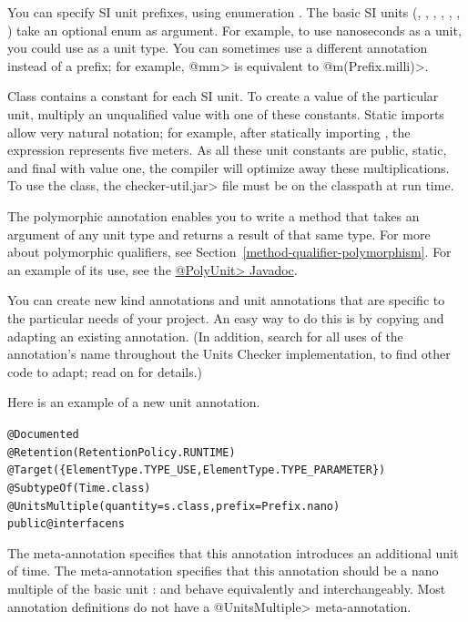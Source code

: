You can specify SI unit prefixes, using enumeration .
The basic SI units
(, , , , ,
 , )
take an optional  enum as argument.
For example, to use nanoseconds as a unit, you could use
 as a unit type.
You can sometimes use a different annotation instead of a prefix;
for example, \<@mm> is equivalent to \<@m(Prefix.milli)>.

Class  contains a constant for each SI unit.
To create a value of the particular unit, multiply an unqualified
value with one of these constants.
Static imports allow very natural notation; for
example, after statically importing ,
the expression  represents five meters.
As all these unit constants are public, static, and final with value
one, the compiler will optimize away these multiplications.
To use the  class, the
\<checker-util.jar> file must be on the classpath at run time.

The polymorphic annotation 
enables you to write a method that takes an argument of any unit type and
returns a result of that same type.  For more about polymorphic qualifiers,
see Section~\ref{method-qualifier-polymorphism}.  For an example of its use, see
the
\href{../api/org/checkerframework/checker/units/qual/PolyUnit.html}{\<@PolyUnit>
Javadoc}.



You can create new kind annotations and unit annotations that are specific
to the particular needs of your project.  An easy way to do this is by
copying and adapting an existing annotation.  (In addition, search for all
uses of the annotation's name throughout the Units Checker implementation,
to find other code to adapt; read on for details.)

Here is an example of a new unit annotation.

\begin{alltt}
@Documented
@Retention(RetentionPolicy.RUNTIME)
@Target(\{ElementType.TYPE_USE, ElementType.TYPE_PARAMETER\})
@SubtypeOf(\ttlcb{}Time.class\ttrcb{})
@UnitsMultiple(quantity=s.class, prefix=Prefix.nano)
public @interface ns \ttlcb{}\ttrcb{}
\end{alltt}

The  meta-annotation specifies that this annotation
introduces an additional unit of time.
The  meta-annotation specifies that this annotation
should be a nano multiple of the basic unit :   and
behave equivalently and interchangeably.
Most annotation definitions do not have a \<@UnitsMultiple> meta-annotation.

